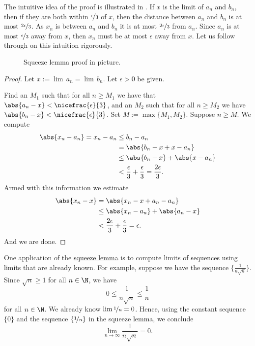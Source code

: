 \documentclass[12pt]{book}
\begin{document}
The intuitive idea of the proof is illustrated in
.
If $x$ is the limit of $a_n$ and $b_n$, then if they are both within
$\nicefrac{\epsilon}{3}$ of $x$, then the distance between $a_n$ and $b_n$
is at most $\nicefrac{2\epsilon}{3}$.
As $x_n$ is between $a_n$ and $b_n$
it is at most $\nicefrac{2\epsilon}{3}$ from $a_n$.
Since $a_n$ is
at most $\nicefrac{\epsilon}{3}$ away from $x$, then $x_n$ must be at
most $\epsilon$ away from $x$.
Let us follow through on this intuition
rigorously.
\begin{figure}[h!t]
\begin{center}
\newcommand{\ltepsilon}{< \nicefrac{2\epsilon}{3} + \nicefrac{\epsilon}{3} =
\epsilon}

\caption{Squeeze lemma proof in picture.\label{figsqueeze}}
\end{center}
\end{figure}

\begin{proof}
Let $x := \lim\, a_n = \lim\, b_n$.
Let $\epsilon > 0$ be given.

Find an $M_1$ such that for all $n \geq M_1$ we have
that $\abs{a_n-x} < \nicefrac{\epsilon}{3}$, and an $M_2$
such that for all $n \geq M_2$
we have $\abs{b_n-x} < \nicefrac{\epsilon}{3}$.
Set $M := \max \{M_1, M_2 \}$.
Suppose $n \geq M$.
We compute
\begin{equation*}
\begin{split}
\abs{x_n - a_n} = x_n-a_n & \leq b_n-a_n \\
& = \abs{b_n - x + x - a_n} \\
& \leq \abs{b_n - x} + \abs{x - a_n} \\
& < \frac{\epsilon}{3} + \frac{\epsilon}{3} = \frac{2\epsilon}{3} .
\end{split}
\end{equation*}
Armed with this information we estimate
\begin{equation*}
\begin{split}
\abs{x_n - x}
&= \abs{x_n - x + a_n - a_n}
\\
&\leq \abs{x_n - a_n} + \abs{a_n - x}
\\
& < \frac{2\epsilon}{3} +  \frac{\epsilon}{3} = \epsilon .
\end{split}
\end{equation*}
And we are done.
\end{proof}

\begin{example}
One application of
the \hyperref[squeeze:lemma]{squeeze lemma} is to compute limits of 
sequences using limits that are already known.
For example, suppose 
we have the sequence $\{ \frac{1}{n\sqrt{n}} \}$.
Since $\sqrt{n} \geq 1$ for all $n \in \N$, we have
\begin{equation*}
0 \leq \frac{1}{n\sqrt{n}} \leq \frac{1}{n}
\end{equation*}
for all $n \in \N$.
We already know $\lim \nicefrac{1}{n} = 0$. 
Hence, using
the constant sequence $\{ 0 \}$ and the sequence $\{ \nicefrac{1}{n} \}$ in the
squeeze lemma, we conclude
\begin{equation*}
\lim_{n\to\infty} \frac{1}{n\sqrt{n}} = 0 .
\end{equation*}
\end{example}
\end{document}
